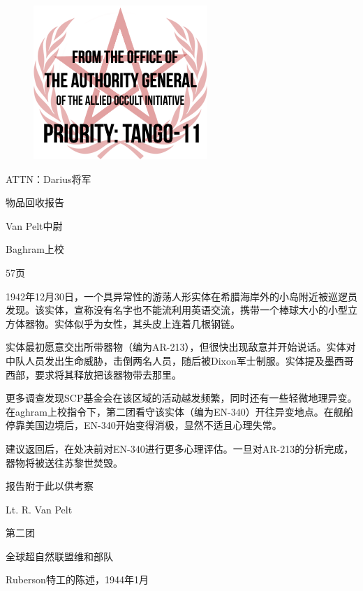 \begin{tcolorbox}[colframe=black, boxrule=0.5pt, colback=white, center upper, leftright skip=0.12\linewidth, breakable]

\begin{figure}[H]
	\centering
	\includegraphics[width=0.6\linewidth]{images/SCP-001-the-broken-god-8.png}
\end{figure}

ATTN：Darius将军

物品回收报告

Van Pelt中尉

Baghram上校

57页

1942年12月30日，一个具异常性的游荡人形实体在希腊海岸外的小岛附近被巡逻员发现。该实体，宣称没有名字也不能流利用英语交流，携带一个棒球大小的小型立方体器物。实体似乎为女性，其头皮上连着几根钢链。

实体最初愿意交出所带器物（编为AR-213），但很快出现敌意并开始说话。实体对中队人员发出生命威胁，击倒两名人员，随后被Dixon军士制服。实体提及墨西哥西部，要求将其释放把该器物带去那里。

更多调查发现SCP基金会在该区域的活动越发频繁，同时还有一些轻微地理异变。在aghram上校指令下，第二团看守该实体（编为EN-340）开往异变地点。在舰船停靠美国边境后，EN-340开始变得消极，显然不适且心理失常。

建议返回后，在处决前对EN-340进行更多心理评估。一旦对AR-213的分析完成，器物将被送往苏黎世焚毁。

报告附于此以供考察

Lt. R. Van Pelt

第二团

全球超自然联盟维和部队

\end{tcolorbox}

Ruberson特工的陈述，1944年1月

